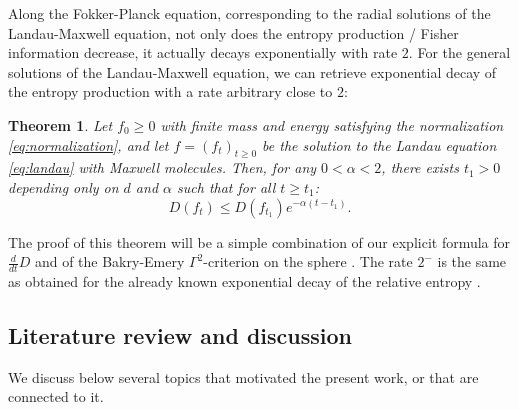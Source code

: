 \documentclass[11pt,a4paper]{article}
\theoremstyle{definition}
\theoremstyle{plain}
\newtheorem{theorem}[defi]{Theorem}
\begin{document}
Along the Fokker-Planck equation, corresponding to the radial solutions of the Landau-Maxwell equation, not only does the entropy production / Fisher information decrease, it actually decays exponentially with rate $2$. For the general solutions of the Landau-Maxwell equation, we can retrieve exponential decay of the entropy production with a rate arbitrary close to $2$:
\begin{theorem}
\label{thm:side}
     Let $f_0\geq 0$ with finite mass and energy satisfying the normalization \eqref{eq:normalization}, and let $f=(f_t)_{t\geq 0}$ be the solution to the Landau equation \eqref{eq:landau} with Maxwell molecules. Then, for any $0< \alpha< 2$, there exists $t_1>0$ depending only on $d$ and $\alpha$ such that for all $t\geq t_1$:
    $$D(f_t)\leq D(f_{t_1})e^{-\alpha (t-t_1)}.$$   
\end{theorem}
The proof of this theorem will be a simple combination of our explicit formula for $\frac{d}{dt}D$ and of the Bakry-Emery $\Gamma^2$-criterion on the sphere \cite{BakryGentilLedoux2014}. The rate $2^-$ is the same as obtained for the already known exponential decay of the relative entropy \cite{Villani1998b,DesvillettesVillani2000}.
    
\subsection{Literature review and discussion}

We discuss below several topics that motivated the present work, or that are connected to it.
\\
\end{document}
